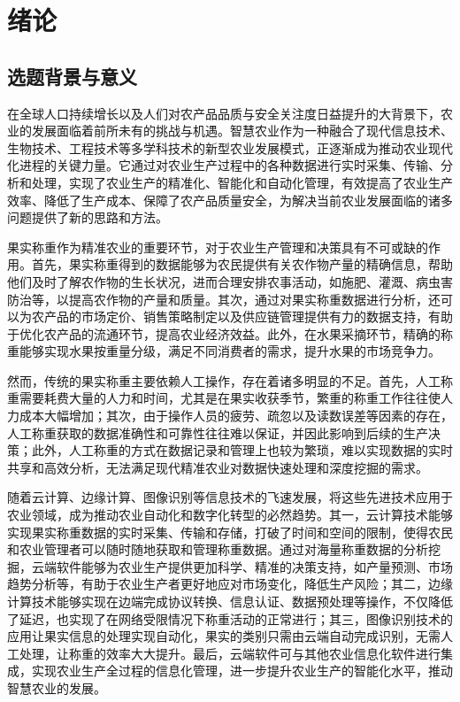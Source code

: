 \chapter{绪论}

\section{选题背景与意义}

在全球人口持续增长以及人们对农产品品质与安全关注度日益提升的大背景下，农业的发展面临着前所未有的挑战与机遇。智慧农业作为一种融合了现代信息技术、生物技术、工程技术等多学科技术的新型农业发展模式\cite{赵春江2021智慧农业的发展现状与未来展望}，正逐渐成为推动农业现代化进程的关键力量。它通过对农业生产过程中的各种数据进行实时采集、传输、分析和处理，实现了农业生产的精准化、智能化和自动化管理\cite{李道亮2012物联网与智慧农业}，有效提高了农业生产效率、降低了生产成本、保障了农产品质量安全，为解决当前农业发展面临的诸多问题提供了新的思路和方法。

果实称重作为精准农业的重要环节，对于农业生产管理和决策具有不可或缺的作用\cite{罗锡文2016信息技术提升农业机械化水平}。首先，果实称重得到的数据能够为农民提供有关农作物产量的精确信息，帮助他们及时了解农作物的生长状况\cite{翁杨2019基于深度学习的农业植物表型研究综述}，进而合理安排农事活动，如施肥、灌溉、病虫害防治等，以提高农作物的产量和质量。其次，通过对果实称重数据进行分析，还可以为农产品的市场定价、销售策略制定以及供应链管理提供有力的数据支持，有助于优化农产品的流通环节，提高农业经济效益\cite{Lipcsei2021AnalysisOA}。此外，在水果采摘环节，精确的称重能够实现水果按重量分级，满足不同消费者的需求，提升水果的市场竞争力\cite{Ji2019}。

然而，传统的果实称重主要依赖人工操作，存在着诸多明显的不足。首先，人工称重需要耗费大量的人力和时间，尤其是在果实收获季节，繁重的称重工作往往使人力成本大幅增加\cite{Jiang2012}；其次，由于操作人员的疲劳、疏忽以及读数误差等因素的存在，人工称重获取的数据准确性和可靠性往往难以保证，并因此影响到后续的生产决策\cite{Chen2002}；此外，人工称重的方式在数据记录和管理上也较为繁琐，难以实现数据的实时共享和高效分析，无法满足现代精准农业对数据快速处理和深度挖掘的需求\cite{Widagdo2020RecordingSO}。

随着云计算、边缘计算、图像识别等信息技术的飞速发展，将这些先进技术应用于农业领域，成为推动农业自动化和数字化转型的必然趋势。其一，云计算技术能够实现果实称重数据的实时采集、传输和存储，打破了时间和空间的限制，使得农民和农业管理者可以随时随地获取和管理称重数据\cite{李道亮2012物联网与智慧农业}。通过对海量称重数据的分析挖掘，云端软件能够为农业生产提供更加科学、精准的决策支持，如产量预测、市场趋势分析等，有助于农业生产者更好地应对市场变化，降低生产风险\cite{韩佳伟2022装备与信息协同促进现代智慧农业发展研究}；其二，边缘计算技术能够实现在边端完成协议转换、信息认证、数据预处理等操作，不仅降低了延迟，也实现了在网络受限情况下称重活动的正常进行\cite{李娜2023基于云边协同计算的粉料仓自称重系统的设计与实现}；其三，图像识别技术的应用让果实信息的处理实现自动化，果实的类别只需由云端自动完成识别，无需人工处理，让称重的效率大大提升\cite{Ni2024}。最后，云端软件可与其他农业信息化软件进行集成\cite{刘洋2013基于物联网与云计算服务的农业温室智能化平台研究与应用术}，实现农业生产全过程的信息化管理，进一步提升农业生产的智能化水平，推动智慧农业的发展。

